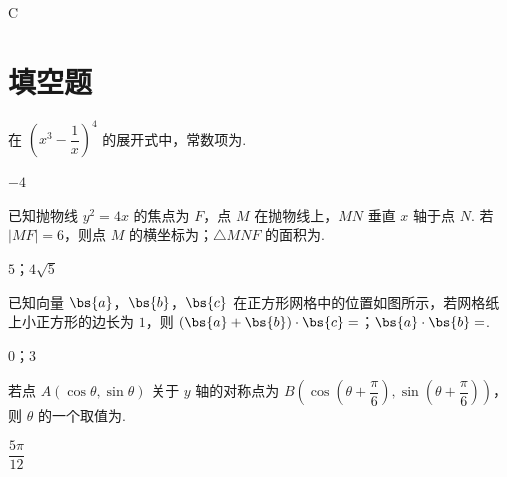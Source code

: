\begin{answer}
C
\end{answer}

\section{填空题}

\begin{problem}
在 \(\left(x^3-\dfrac{1}{x}\right)^4\) 的展开式中，常数项为\fillinblank{}.
\end{problem}

\begin{answer}
\(-4\)
\end{answer}

\begin{problem}
已知抛物线 \(y^2=4x\) 的焦点为 \(F\)，点 \(M\) 在抛物线上，\(MN\) 垂直 \(x\) 轴于点 \(N\). 若 \(|MF|=6\)，则点 \(M\) 的横坐标为\fillinblank{}；\(\triangle MNF\) 的面积为\fillinblank{}.
\end{problem}

\begin{answer}
\(5\)；\(4\sqrt5\)
\end{answer}

\begin{problem}
已知向量 \(\bs{a}\)，\(\bs{b}\)，\(\bs{c}\) 在正方形网格中的位置如图所示，若网格纸上小正方形的边长为 \(1\)，则 \((\bs{a}+\bs{b})\cdot\bs{c}=\)\fillinblank{}；\(\bs{a}\cdot\bs{b}=\)\fillinblank{}.

\end{problem}

\begin{answer}
\(0\)；\(3\)
\end{answer}

\begin{problem}
若点 \(A(\cos\theta,\sin\theta)\) 关于 \(y\) 轴的对称点为 \(B\left(\cos\left(\theta+\dfrac{\pi}{6}\right),\sin\left(\theta+\dfrac{\pi}{6}\right)\right)\)，则 \(\theta\) 的一个取值为\fillinblank{}.
\end{problem}

\begin{answer}
\(\dfrac{5\pi}{12}\)
\end{answer}

